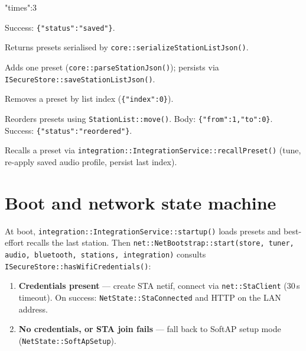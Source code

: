 \begin{drnote}
\begin{drcode}[JSON]
{"times":3}
\end{drcode}
Success: \texttt{\{"status":"saved"\}}.
\end{drnote}


\label{sec:api-stations-get}

Returns presets serialised by \texttt{core::serializeStationListJson()}.

\label{sec:api-stations-post}

Adds one preset (\texttt{core::parseStationJson()}); persists via
\texttt{ISecureStore::saveStationListJson()}.

\label{sec:api-stations-remove}

Removes a preset by list index (\texttt{\{"index":0\}}).

\label{sec:api-stations-reorder}

Reorders presets using \texttt{StationList::move()}. Body:
\texttt{\{"from":1,"to":0\}}. Success: \texttt{\{"status":"reordered"\}}.

\label{sec:api-stations-tune}

Recalls a preset via \texttt{integration::IntegrationService::recallPreset()}
(tune, re-apply saved audio profile, persist last index).

\section{Boot and network state machine}
\label{sec:api-boot-flow}

At boot, \texttt{integration::IntegrationService::startup()} loads presets
and best-effort recalls the last station. Then
\texttt{net::NetBootstrap::start(store, tuner, audio, bluetooth, stations,
integration)} consults \texttt{ISecureStore::hasWifiCredentials()}:

\begin{enumerate}
  \item \textbf{Credentials present} --- create STA netif, connect via
        \texttt{net::StaClient} (30\,s timeout). On success:
        \texttt{NetState::StaConnected} and HTTP on the LAN address.
  \item \textbf{No credentials, or STA join fails} --- fall back to
        SoftAP setup mode (\texttt{NetState::SoftApSetup}).
\end{enumerate}

